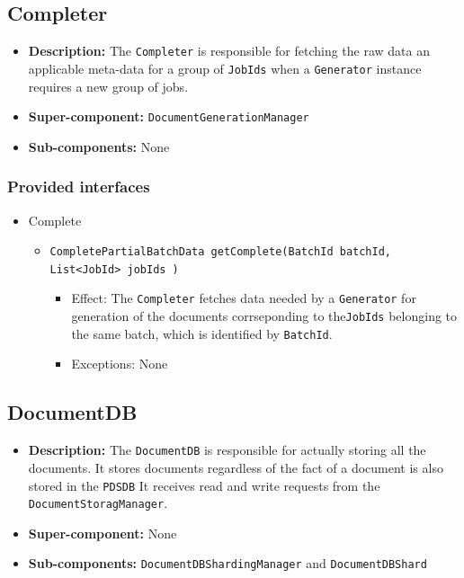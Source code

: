 \documentclass[a4paper,10pt]{article}
\begin{document}
\subsection{Completer}
\begin{itemize}
    \item \textbf{Description:} The \texttt{Completer} is responsible for fetching the raw data an applicable meta-data for a group of \texttt{JobIds} when a \texttt{Generator} instance requires a new group of jobs.
    \item \textbf{Super-component:} \texttt{DocumentGenerationManager}
    \item \textbf{Sub-components:} None
\end{itemize}

\subsubsection*{Provided interfaces}
\begin{itemize}
    \item Complete
    \begin{itemize}
        \item \texttt{CompletePartialBatchData getComplete(BatchId batchId, List<JobId> jobIds )}
        \begin{itemize}
            \item Effect: The \texttt{Completer} fetches data needed by a \texttt{Generator} for generation of the documents corrseponding to the\texttt{JobIds} belonging to the same batch, which is identified by \texttt{BatchId}.
            \item Exceptions: None
        \end{itemize}
    \end{itemize}
\end{itemize}

\subsection{DocumentDB}
\begin{itemize}
    \item \textbf{Description:} The \texttt{DocumentDB} is responsible  for actually storing all the documents. It stores documents regardless of the fact of a document is also stored in the \texttt{PDSDB} It receives read and write requests from the \texttt{DocumentStoragManager}.
    \item \textbf{Super-component:} None
    \item \textbf{Sub-components:} \texttt{DocumentDBShardingManager} and \texttt{DocumentDBShard}
\end{itemize}
\end{document}
